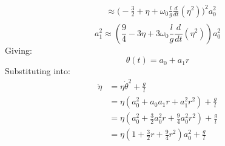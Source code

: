 \documentclass[9pt]{report}
\begin{document}
\begin{enumerate}
\[\begin{align}
          &\approx \Big(-\frac{3}{2}+\eta + \omega_0 \frac{l}{g} \frac{d}{dt}(\eta^2) \Big)^2 a_0^2 \\
  \end{align}
\]
\[
a_1^2 \approx (\frac{9}{4}-3\eta + 3 \omega_0 \frac{l}{g} \frac{d}{dt}(\eta^2))a_0^2
\]
Giving:
\[
  \theta(t) = a_0 + a_1 r
\]
Substituting into:
\[
  \begin{align}
    \ddot{\eta} &= \eta \dot{\theta}^2 + \frac{g}{l} \\
                &= \eta (a_0^2 + a_0 a_1 r + a_1^2 r^2) + \frac{g}{l} \\
                &= \eta (a_0^2 + \frac{3}{2} a_0^2 r + \frac{9}{4}a_0^2 r^2) + \frac{g}{l} \\
                &= \eta (1 + \frac{3}{2} r + \frac{9}{4} r^2) a_0^2 + \frac{g}{l} \\
  \end{align}
\]
\end{enumerate}
\chapter{}
\chapter{}
\end{document}
